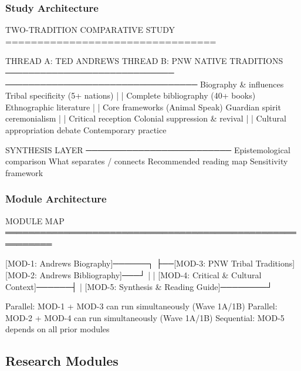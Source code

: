 \documentclass[11pt,letterpaper]{article}
\begin{document}
\subsubsection{Study Architecture}

\begin{asciibox}
TWO-TRADITION COMPARATIVE STUDY
=================================

THREAD A: TED ANDREWS                THREAD B: PNW NATIVE TRADITIONS
─────────────────────────────        ─────────────────────────────────
Biography & influences               Tribal specificity (5+ nations)
  |                                    |
Complete bibliography (40+ books)    Ethnographic literature
  |                                    |
Core frameworks (Animal Speak)       Guardian spirit ceremonialism
  |                                    |
Critical reception                   Colonial suppression & revival
  |                                    |
Cultural appropriation debate        Contemporary practice

         SYNTHESIS LAYER
    ─────────────────────────
    Epistemological comparison
    What separates / connects
    Recommended reading map
    Sensitivity framework
\end{asciibox}

\subsubsection{Module Architecture}

\begin{asciibox}
MODULE MAP
══════════════════════════════════════════════════════════

  [MOD-1: Andrews Biography]──────┐
                                  ├──[MOD-3: PNW Tribal Traditions]
  [MOD-2: Andrews Bibliography]───┘         |
                                            |
  [MOD-4: Critical & Cultural Context]──────┤
                                            |
  [MOD-5: Synthesis & Reading Guide]────────┘

Parallel: MOD-1 + MOD-3 can run simultaneously (Wave 1A/1B)
Parallel: MOD-2 + MOD-4 can run simultaneously (Wave 1A/1B)
Sequential: MOD-5 depends on all prior modules
\end{asciibox}

\subsection{Research Modules}
\end{document}
